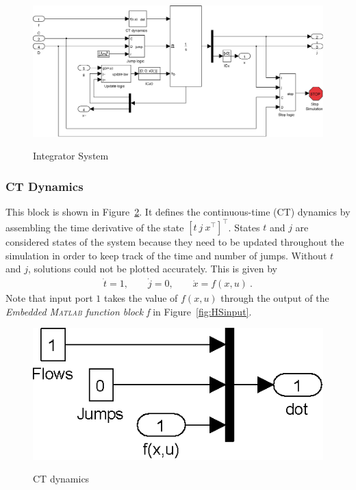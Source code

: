 \documentclass{article}
\newcommand{\matlab}{\textsc{Matlab}}
\begin{document}
\begin{figure}[ht]
  \begin{center}
    {\includegraphics[width=.95\textwidth]{figures/Simulink/Integrator.eps}}
   \caption{Integrator System}
\label{fig:integratorsystem}
  \end{center}
\end{figure}


\subsubsection{CT Dynamics}

This block is shown in Figure~\ref{fig:CTdynamics}. It defines the continuous-time (CT) dynamics by assembling the time derivative of the state $[t\ j\ x^\top]^\top$. States $t$ and $j$ are considered states of the system because they need to be updated throughout the simulation in order to keep track of the time and number of jumps. Without $t$ and $j$, solutions could not be plotted accurately.
This is given by
\begin{eqnarray*}
\dot{t} = 1, \qquad \dot{j} = 0, \qquad \dot{x} = f(x,u)\ .
\end{eqnarray*}
Note that input port $1$ takes the value of $f(x,u)$ through the output of the
{\em Embedded \matlab{} function block f} in Figure~\ref{fig:HSinput}.

\begin{figure}[ht]
  \begin{center}
    {\includegraphics[width=.4\textwidth]{figures/Simulink/CTdynamics.eps}}
   \caption{CT dynamics}
\label{fig:CTdynamics}
 \end{center}
\end{figure}
\end{document}
